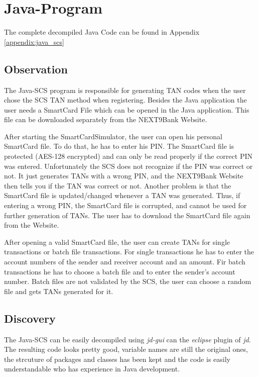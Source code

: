 \chapter{Java-Program}

The complete decompiled Java Code can be found in Appendix \ref{appendix:java_scs}

\section{Observation}

The Java-SCS program is responsible for generating TAN codes when the user chose the SCS TAN method when registering. Besides the Java application the user needs a SmartCard File which can be opened in the Java application. This file can be downloaded separately from the NEXT9Bank Website.

After starting the SmartCardSimulator, the user can open his personal SmartCard file. To do that, he has to enter his PIN. The SmartCard file is protected (AES-128 encrypted) and can only be read properly if the correct PIN was entered. Unfortunately the SCS does not recognize if the PIN was correct or not. It just generates TANs with a wrong PIN, and the NEXT9Bank Website then tells you if the TAN was correct or not. Another problem is that the SmartCard file is updated/changed whenever a TAN was generated. Thus, if entering a wrong PIN, the SmartCard file is corrupted, and cannot be used for further generation of TANs. The user has to download the SmartCard file again from the Website.

After opening a valid SmartCard file, the user can create TANs for single transactions or batch file transactions. For single transactions he has to enter the account numbers of the sender and receiver account and an amount. Fir batch transactions he has to choose a batch file and to enter the sender's account number. Batch files are not validated by the SCS, the user can choose a random file and gets TANs generated for it.

\section{Discovery}

The Java-SCS can be easily decompiled using \textit{jd-gui} can the \textit{eclipse} plugin of \textit{jd}. The resulting code looks pretty good, variable names are still the original ones, the strcuture of packages and classes has been kept and the code is easily understandable who has experience in Java development.

